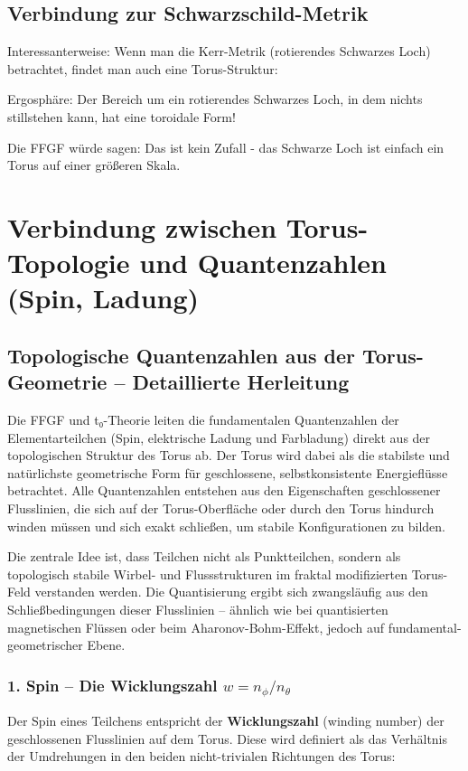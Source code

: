 	\subsection{Verbindung zur Schwarzschild-Metrik}
	Interessanterweise: Wenn man die Kerr-Metrik (rotierendes Schwarzes Loch) betrachtet, findet man auch eine Torus-Struktur:
	
	Ergosphäre: Der Bereich um ein rotierendes Schwarzes Loch, in dem nichts stillstehen kann, hat eine toroidale Form!
	
	Die FFGF würde sagen: Das ist kein Zufall - das Schwarze Loch ist einfach ein Torus auf einer größeren Skala.
	
	\section{Verbindung zwischen Torus-Topologie und Quantenzahlen (Spin, Ladung)}
	
	\subsection{Topologische Quantenzahlen aus der Torus-Geometrie – Detaillierte Herleitung}
	
	Die FFGF und t₀-Theorie leiten die fundamentalen Quantenzahlen der Elementarteilchen (Spin, elektrische Ladung und Farbladung) direkt aus der topologischen Struktur des Torus ab. Der Torus wird dabei als die stabilste und natürlichste geometrische Form für geschlossene, selbstkonsistente Energieflüsse betrachtet. Alle Quantenzahlen entstehen aus den Eigenschaften geschlossener Flusslinien, die sich auf der Torus-Oberfläche oder durch den Torus hindurch winden müssen und sich exakt schließen, um stabile Konfigurationen zu bilden.
	
	Die zentrale Idee ist, dass Teilchen nicht als Punktteilchen, sondern als topologisch stabile Wirbel- und Flussstrukturen im fraktal modifizierten Torus-Feld verstanden werden. Die Quantisierung ergibt sich zwangsläufig aus den Schließbedingungen dieser Flusslinien – ähnlich wie bei quantisierten magnetischen Flüssen oder beim Aharonov-Bohm-Effekt, jedoch auf fundamental-geometrischer Ebene.
	
	\subsubsection{1. Spin – Die Wicklungszahl $w = n_\phi / n_\theta$}
	
	Der Spin eines Teilchens entspricht der \textbf{Wicklungszahl} (winding number) der geschlossenen Flusslinien auf dem Torus. Diese wird definiert als das Verhältnis der Umdrehungen in den beiden nicht-trivialen Richtungen des Torus:
	
